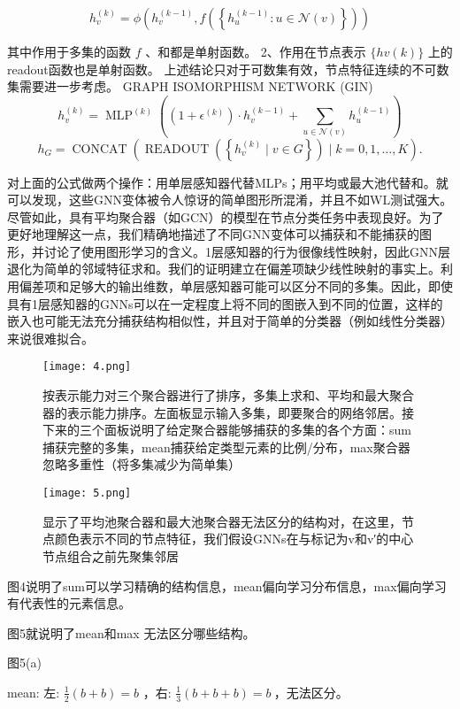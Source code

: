 \documentclass[a4paper,UTF8]{article}
\numberwithin{equation}{section}
\begin{document}
{		$$
		h_{v}^{(k)}=\phi\left(h_{v}^{(k-1)}, f\left(\left\{h_{u}^{(k-1)}: u \in \mathcal{N}(v)\right\}\right)\right)
		$$
		
		其中作用于多集的函数 $f$ 、和都是单射函数。
		2、作用在节点表示 $\{h v(k)\}$ 上的readout函数也是单射函数。
		上述结论只对于可数集有效，节点特征连续的不可数集需要进一步考虑。
		GRAPH ISOMORPHISM NETWORK (GIN)
		$$
		h_{v}^{(k)}=\operatorname{MLP}^{(k)}\left(\left(1+\epsilon^{(k)}\right) \cdot h_{v}^{(k-1)}+\sum_{u \in \mathcal{N}(v)} h_{u}^{(k-1)}\right)
		$$
		$$
		h_{G}=\operatorname{CONCAT}\left(\operatorname{READOUT}\left(\left\{h_{v}^{(k)} \mid v \in G\right\}\right) \mid k=0,1, \ldots, K\right) .
		$$
		
		对上面的公式做两个操作：用单层感知器代替MLPs；用平均或最大池代替和。就可以发现，这些GNN变体被令人惊讶的简单图形所混淆，并且不如WL测试强大。尽管如此，具有平均聚合器（如GCN）的模型在节点分类任务中表现良好。为了更好地理解这一点，我们精确地描述了不同GNN变体可以捕获和不能捕获的图形，并讨论了使用图形学习的含义。1层感知器的行为很像线性映射，因此GNN层退化为简单的邻域特征求和。我们的证明建立在偏差项缺少线性映射的事实上。利用偏差项和足够大的输出维数，单层感知器可能可以区分不同的多集。因此，即使具有1层感知器的GNNs可以在一定程度上将不同的图嵌入到不同的位置，这样的嵌入也可能无法充分捕获结构相似性，并且对于简单的分类器（例如线性分类器）来说很难拟合。
		
		\begin{figure}[ht]
			\centering
			\texttt{[image: 4.png]}
			\caption{按表示能力对三个聚合器进行了排序，多集上求和、平均和最大聚合器的表示能力排序。左面板显示输入多集，即要聚合的网络邻居。接下来的三个面板说明了给定聚合器能够捕获的多集的各个方面：sum捕获完整的多集，mean捕获给定类型元素的比例/分布，max聚合器忽略多重性（将多集减少为简单集）}
			\label{fig:label}
		\end{figure}
		
		\begin{figure}[ht]
			\centering
			\texttt{[image: 5.png]}
			\caption{显示了平均池聚合器和最大池聚合器无法区分的结构对，在这里，节点颜色表示不同的节点特征，我们假设GNNs在与标记为v和v′的中心节点组合之前先聚集邻居}
			\label{fig:label}
		\end{figure}
		
		图4说明了sum可以学习精确的结构信息，mean偏向学习分布信息，max偏向学习有代表性的元素信息。
		
		图5就说明了mean和max 无法区分哪些结构。
		
		图5(a)
		
		mean: 左: $\frac{1}{2}(b+b)=b$ ，右: $\frac{1}{3}(b+b+b)=b \mathrm{~ ， 无 法 区 分 。 ~}$
		
}
\end{document}
